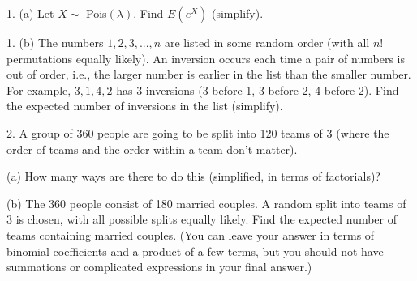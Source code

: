 \documentclass{article}
\begin{document}
\header

\vspace{10mm}

1. (a) Let $X\sim$ Pois$(\lambda)$. Find $E(e^X)$ (simplify).


1. (b) The numbers $1,2,3,...,n$ are listed in some random order (with all $n!$ permutations equally likely).  An inversion occurs each time a pair of numbers is out of order, i.e., the larger number is earlier in the list than the smaller number.  For example, $3,1,4,2$ has 3 inversions (3 before 1, 3 before 2, 4 before 2).  Find the expected number of inversions in the list (simplify).


\newpage

2. A group of 360 people are going to be split into 120 teams of 3 (where the order of teams and the order within a team don’t matter).

(a) How many ways are there to do this (simplified, in terms of factorials)?


(b) The  360  people  consist  of  180  married  couples.   A  random  split  into  teams  of  3 is  chosen,  with  all  possible  splits  equally  likely.   Find  the  expected  number  of  teams containing married couples.  (You can leave your answer in terms of binomial coefficients and  a  product  of  a  few  terms,  but  you  should  not  have  summations  or  complicated expressions in your final answer.)
\end{document}
